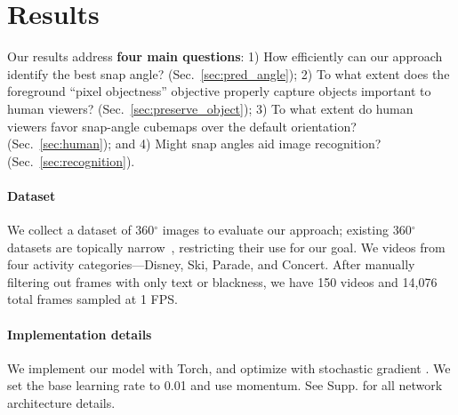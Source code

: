 \vspace{-0.1in}
\section{Results}\label{sec:results}

Our results address \textbf{four main questions}: 
1) How efficiently can our approach identify the best snap angle? (Sec.~\ref{sec:pred_angle});
2) To what extent does the foreground ``pixel objectness'' objective properly capture objects important to human viewers? (Sec.~\ref{sec:preserve_object});
3) To what extent do human viewers favor snap-angle cubemaps over the default orientation? (Sec.~\ref{sec:human}); and 4) Might snap angles aid image recognition? (Sec.~\ref{sec:recognition}).


\vspace*{-0.1in}
\paragraph{Dataset}

We collect a dataset of 360$^{\circ}$ images to evaluate our approach; existing 360$^{\circ}$ datasets are topically narrow~\cite{xiao2012recognizing,su2016pano2vid,hu2017deep}, restricting their use for our goal.  
We  videos from four activity categories---Disney, Ski, Parade, and Concert.  %
After manually filtering out frames with only text or blackness, we have 150 videos and 14,076 total frames sampled at 1 FPS.


\vspace*{-0.1in}
\paragraph{Implementation details}

We implement our model with Torch, and optimize with stochastic gradient . We set the base learning rate to 0.01 and use momentum.  %
See Supp. for all network architecture details.  









